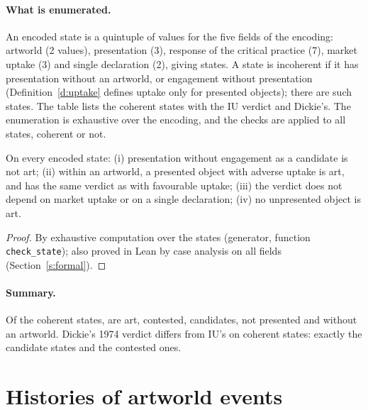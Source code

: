 \documentclass{situationist-preprint}
\begin{document}
\paragraph{What is enumerated.} An encoded state is a quintuple of values for the five fields of the encoding: artworld (2 values), presentation (3), response of the critical practice (7), market uptake (3) and single declaration (2), giving \stnstates{} states. A state is incoherent if it has presentation without an artworld, or engagement without presentation (Definition~\ref{d:uptake} defines uptake only for presented objects); there are \stnincoherent{} such states. The table lists the \stncoherent{} coherent states with the IU verdict and Dickie's. The enumeration is exhaustive over the encoding, and the checks are applied to all \stnstates{} states, coherent or not.

\begin{proposition}\label{p:census}
On every encoded state: (i) presentation without engagement as a candidate is not art; (ii) within an artworld, a presented object with adverse uptake is art, and has the same verdict as with favourable uptake; (iii) the verdict does not depend on market uptake or on a single declaration; (iv) no unpresented object is art.
\end{proposition}

\begin{proof}
By exhaustive computation over the \stnstates{} states (generator, function \texttt{check\_state}); also proved in Lean by case analysis on all fields (Section~\ref{s:formal}).
\end{proof}

\paragraph{Summary.} Of the coherent states, \stcsA{} are art, \stcsC{} contested, \stcsK{} candidates, \stcsN{} not presented and \stcsW{} without an artworld. Dickie's 1974 verdict differs from IU's on \stcensusdiv{} coherent states: exactly the candidate states and the contested ones.



\section{Histories of artworld events}\label{app:histories}
\end{document}
